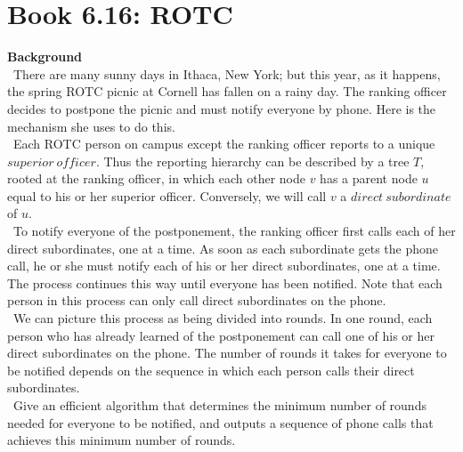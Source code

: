 \documentclass[12pt]{article}
\begin{document}

\newcommand{\hmwkClass}{COS 255}
\newcommand{\hmwkSemester}{Spring 2016}

\newcommand{\hmwkAuthorName}{Lukas Leung}
\newcommand{\hmwkAuthorID}{lleung}

\newcommand{\hmwkAssignmentNum}{6}

\newcommand{\hmwkProblemNum}{3}

\newcommand{\hmwkCollaborators}{}
\thispagestyle{fancycollab}


\section{Book 6.16: ROTC}
\textbf{Background} \\
~\indent There are many sunny days in Ithaca, New York; but this year, as it happens, the
spring ROTC picnic at Cornell has fallen on a rainy day. The ranking officer decides
to postpone the picnic and must notify everyone by phone. Here is the mechanism
she uses to do this. \\
~\indent Each ROTC person on campus except the ranking officer reports to a unique
$superior\ officer$. Thus the reporting hierarchy can be described by a tree $T$, rooted
at the ranking officer, in which each other node $v$ has a parent node $u$ equal to his or
her superior officer. Conversely, we will call $v$ a $direct\ subordinate$ of $u$. \\
~\indent To notify everyone of the postponement, the ranking officer first calls each of her
direct subordinates, one at a time. As soon as each subordinate gets the phone call,
he or she must notify each of his or her direct subordinates, one at a time. The
process continues this way until everyone has been notified. Note that each person in
this process can only call direct subordinates on the phone. \\
~\indent We can picture this process as being divided into rounds. In one round, each
person who has already learned of the postponement can call one of his or her direct
subordinates on the phone. The number of rounds it takes for everyone to be notified
depends on the sequence in which each person calls their direct subordinates. \\
~\indent Give an efficient algorithm that determines the minimum number of rounds needed
for everyone to be notified, and outputs a sequence of phone calls that achieves this
minimum number of rounds.
\end{document}
